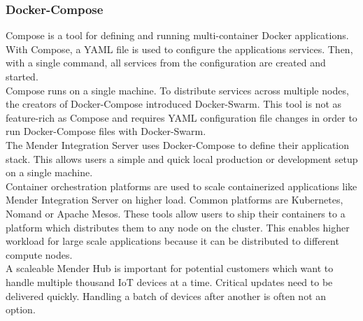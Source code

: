 \subsubsection{Docker-Compose} \label{docker-compose}
Compose is a tool for defining and running multi-container Docker applications. With Compose, a YAML file is used to configure the applications services. Then, with a single command, all services from the configuration are created and started.\cite{docker-compose}\\
Compose runs on a single machine. To distribute services across multiple nodes, the creators of Docker-Compose introduced Docker-Swarm. This tool is not as feature-rich as Compose and requires YAML configuration file changes in order to run Docker-Compose files with Docker-Swarm.\\
The Mender Integration Server uses Docker-Compose to define their application stack. This allows users a simple and quick local production or development setup on a single machine.\\
Container orchestration platforms are used to scale containerized applications like Mender Integration Server on higher load. Common platforms are Kubernetes, Nomand or Apache Mesos. These tools allow users to ship their containers to a platform which distributes them to any node on the cluster. This enables higher workload for large scale applications because it can be distributed to different compute nodes.\\
A scaleable Mender Hub is important for potential customers which want to handle multiple thousand IoT devices at a time. Critical updates need to be delivered quickly. Handling a batch of devices after another is often not an option.
